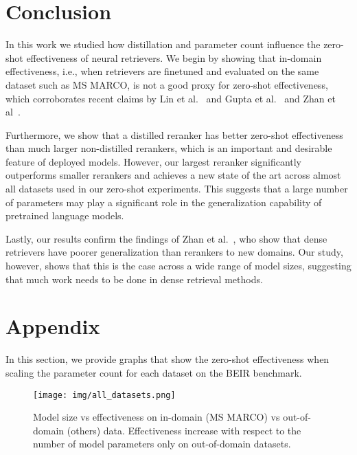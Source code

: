 \documentclass[sigconf,nonacm]{acmart}
\begin{document}
\section{Conclusion}

In this work we studied how distillation and parameter count influence the zero-shot effectiveness of neural retrievers. We begin by showing that in-domain effectiveness, i.e., when retrievers are finetuned and evaluated on the same dataset such as MS MARCO, is not a good proxy for zero-shot effectiveness, which corroborates recent claims by Lin et al.~\cite{lin2022fostering} and Gupta et al.~\cite{gupta2022survivorship} and Zhan et al~\cite{dense_2022}.

Furthermore, we show that a distilled reranker has better zero-shot effectiveness than much larger non-distilled rerankers, which is an important and desirable feature of deployed models. However, our largest reranker significantly outperforms smaller rerankers and achieves a new state of the art across almost all datasets used in our zero-shot experiments. This suggests that a large number of parameters may play a significant role in the generalization capability of pretrained language models.

Lastly, our results confirm the findings of Zhan et al.~\cite{dense_2022}, who show that dense retrievers have poorer generalization than rerankers to new domains. Our study, however, shows that this is the case across a wide range of model sizes, suggesting that much work needs to be done in dense retrieval methods.






\onecolumn
\appendix

\section{Appendix}

In this section, we provide graphs that show the zero-shot effectiveness when scaling the parameter count for each dataset on the BEIR benchmark.

\begin{figure*}[h]
  \centering
  \texttt{[image: img/all\_datasets.png]}
  \caption{Model size vs effectiveness on in-domain (MS MARCO) vs out-of-domain (others) data. Effectiveness increase with respect to the number of model parameters only on out-of-domain datasets.}
  \label{fig:graphs}
\end{figure*}
\end{document}
